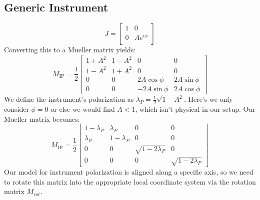 \subsection{Generic Instrument}
\begin{equation}
    J = \begin{bmatrix}
    1 & 0 \\
    0 & A e^{i\phi}\\
  \end{bmatrix}
\end{equation}
Converting this to a Mueller matrix yields:
\begin{equation}
    M_{\text{IP}} = \frac{1}{2}\begin{bmatrix}
    1+A^2 & 1-A^2 & 0& 0\\
    1-A^2 & 1+A^2 & 0& 0\\
    0 & 0 & 2A\cos\phi & 2A\sin\phi\\
    0 & 0 & -2A\sin\phi & 2A\cos\phi
  \end{bmatrix}
\end{equation}
We define the instrument's polarization as $\lambda_P = \frac{1}{2}\sqrt{1-A^2}$.  Here's we only consider $\phi=0$ or else we would find $A<1$, which isn't physical in our setup.  Our Mueller matrix becomes:
\begin{equation}
    M_{\text{IP}} = \frac{1}{2}\begin{bmatrix}
    1-\lambda_P & \lambda_P & 0& 0\\
    \lambda_P & 1-\lambda_P & 0& 0\\
    0 & 0 & \sqrt{1-2\lambda_P} & 0\\
    0 & 0 & 0 & \sqrt{1-2\lambda_P}
  \end{bmatrix}
\end{equation}
Our model for instrument polarization is aligned along a specific axis, so we need to rotate this matrix into the appropriate local coordinate system via the rotation matrix $M_{rot}$.
